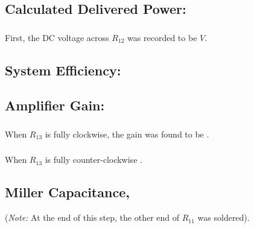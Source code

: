 \subsection{Calculated Delivered Power: }
\subsubsection{ } 
  First, the DC voltage across $R_12$ was recorded to be $\boxed{ V}$.
  \subsubsection{ }
\subsection{System Efficiency: \bm{$\eta$}}

\subsection{Amplifier Gain: }

\subsubsection{}
When $R_{13}$ is fully clockwise, the gain was found to be 
$\boxed{}$.
\subsubsection{}
When $R_{13}$ is fully counter-clockwise
$\boxed{}$.

\subsection{Miller Capacitance, }

(\emph{Note:} At the end of this step, the other end of $R_{11}$ was soldered).
